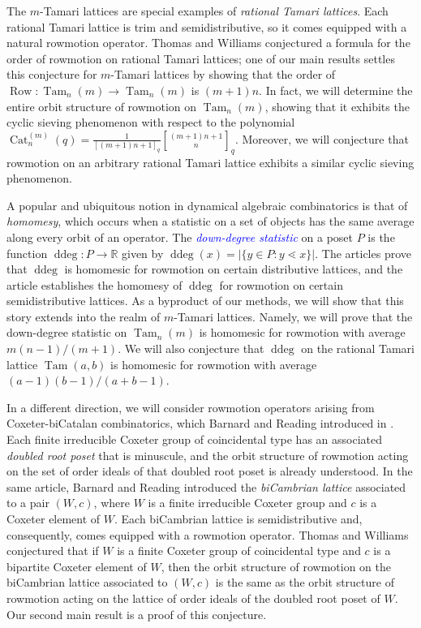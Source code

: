 \documentclass[11pt]{amsart}
\theoremstyle{definition}
\DeclareMathOperator{\ddeg}{ddeg}
\DeclareMathOperator{\Tam}{Tam}
\DeclareMathOperator{\row}{Row}
\DeclareMathOperator{\Cat}{Cat}
\newcommand{\dfn}[1]{\textcolor{blue}{\emph{#1}}}
\begin{document}
The $m$-Tamari lattices are special examples of \emph{rational Tamari lattices}. Each rational Tamari lattice is trim and semidistributive, so it comes equipped with a natural rowmotion operator. Thomas and Williams conjectured a formula for the order of rowmotion on rational Tamari lattices; one of our main results settles this conjecture for $m$-Tamari lattices by showing that the order of $\row\colon\Tam_n(m)\to\Tam_n(m)$ is $(m+1)n$. In fact, we will determine the entire orbit structure of rowmotion on $\Tam_n(m)$, showing that it exhibits the cyclic sieving phenomenon with respect to the polynomial $\Cat_n^{(m)}(q)=\frac{1}{[(m+1)n+1]_q}{(m+1)n+1\brack n}_q$. Moreover, we will conjecture that rowmotion on an arbitrary rational Tamari lattice exhibits a similar cyclic sieving phenomenon. 

A popular and ubiquitous notion in dynamical algebraic combinatorics is that of \emph{homomesy}, which occurs when a statistic on a set of objects has the same average along every orbit of an operator. The \dfn{down-degree statistic} on a poset $P$ is the function $\ddeg\colon P\to\mathbb R$ given by $\ddeg(x)=\lvert\{y\in P:y\lessdot x\}\rvert$. The articles \cite{AST, ProppRoby, RushWang} prove that $\ddeg$ is homomesic for rowmotion on certain distributive lattices, and the article \cite{HopkinsCDE} establishes the homomesy of $\ddeg$ for rowmotion on certain semidistributive lattices. As a byproduct of our methods, we will show that this story extends into the realm of $m$-Tamari lattices. Namely, we will prove that the down-degree statistic on $\Tam_n(m)$ is homomesic for rowmotion with average $m(n-1)/(m+1)$. We will also conjecture that $\ddeg$ on the rational Tamari lattice $\Tam(a,b)$ is homomesic for rowmotion with average $(a-1)(b-1)/(a+b-1)$. 

In a different direction, we will consider rowmotion operators arising from Coxeter-biCatalan combinatorics, which Barnard and Reading introduced in \cite{BarnardReading}. Each finite irreducible Coxeter group of coincidental type has an associated \emph{doubled root poset} that is minuscule, and the orbit structure of rowmotion acting on the set of order ideals of that doubled root poset is already understood. In the same article, Barnard and Reading introduced the \emph{biCambrian lattice} associated to a pair $(W,c)$, where $W$ is a finite irreducible Coxeter group and $c$ is a Coxeter element of $W$. Each biCambrian lattice is semidistributive and, consequently, comes equipped with a rowmotion operator. Thomas and Williams \cite{ThomasWilliams} conjectured that if $W$ is a finite Coxeter group of coincidental type and $c$ is a bipartite Coxeter element of $W$, then the orbit structure of rowmotion on the biCambrian lattice associated to $(W,c)$ is the same as the orbit structure of rowmotion acting on the lattice of order ideals of the doubled root poset of $W$. Our second main result is a proof of this conjecture. 
\end{document}

